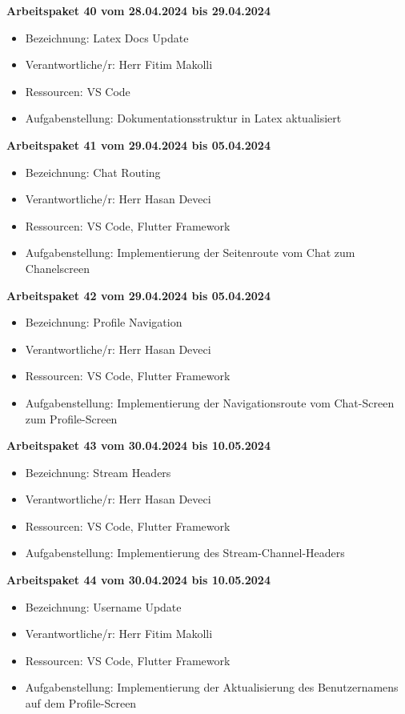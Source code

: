 \textbf{Arbeitspaket 40 vom 28.04.2024 bis 29.04.2024}
\begin{itemize}[itemsep=0pt]
    \item{Bezeichnung: Latex Docs Update} 
	\item{Verantwortliche/r: Herr Fitim Makolli} 
	\item{Ressourcen: VS Code} 
    \item{Aufgabenstellung: Dokumentationsstruktur in Latex aktualisiert}
\end{itemize} 

\textbf{Arbeitspaket 41 vom 29.04.2024 bis 05.04.2024}
\begin{itemize}[itemsep=0pt]
    \item{Bezeichnung: Chat Routing} 
	\item{Verantwortliche/r: Herr Hasan Deveci} 
	\item{Ressourcen: VS Code, Flutter Framework} 
    \item{Aufgabenstellung: Implementierung der Seitenroute vom Chat zum Chanelscreen}
\end{itemize} 

\textbf{Arbeitspaket 42 vom 29.04.2024 bis 05.04.2024}
\begin{itemize}[itemsep=0pt]
    \item{Bezeichnung: Profile Navigation} 
	\item{Verantwortliche/r: Herr Hasan Deveci} 
	\item{Ressourcen: VS Code, Flutter Framework} 
    \item{Aufgabenstellung: Implementierung der Navigationsroute vom Chat-Screen zum Profile-Screen}
\end{itemize} 

\textbf{Arbeitspaket 43 vom 30.04.2024 bis 10.05.2024}
\begin{itemize}[itemsep=0pt]
    \item{Bezeichnung: Stream Headers} 
	\item{Verantwortliche/r: Herr Hasan Deveci} 
	\item{Ressourcen: VS Code, Flutter Framework} 
    \item{Aufgabenstellung: Implementierung des Stream-Channel-Headers}
\end{itemize} 

\textbf{Arbeitspaket 44 vom 30.04.2024 bis 10.05.2024}
\begin{itemize}[itemsep=0pt]
    \item{Bezeichnung: Username Update} 
	\item{Verantwortliche/r: Herr Fitim Makolli} 
	\item{Ressourcen: VS Code, Flutter Framework} 
    \item{Aufgabenstellung: Implementierung der Aktualisierung des Benutzernamens auf dem Profile-Screen}
\end{itemize} 

